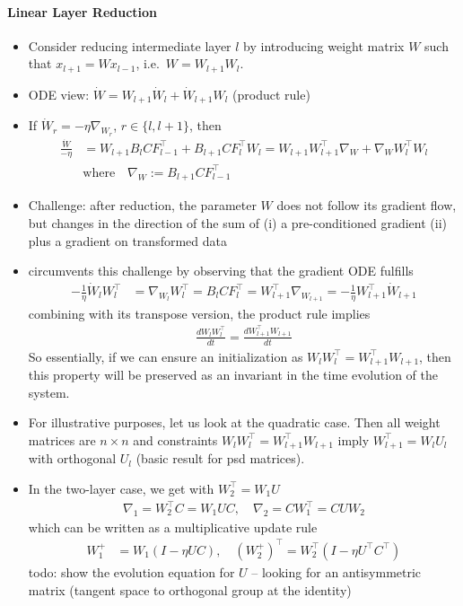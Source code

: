 \documentclass{article}
\begin{document}
\paragraph{Linear Layer Reduction}
\begin{itemize}
\item Consider reducing intermediate layer $l$ by introducing weight matrix $W$ such that $x_{l+1} = W x_{l-1}$, i.e.~$W = W_{l+1} W_{l}$. 
\item ODE view: $\dot W = W_{l+1} \dot W_{l} + \dot W_{l+1} W_l$ (product rule)
\item If $\dot W_r = - \eta \nabla_{W_r}$, $r\in \{l,l+1\}$, then  
\begin{align}
\frac{\dot W}{-\eta} & = W_{l+1} B_{l} C F_{l-1}^\top + B_{l+1}CF_{l}^\top W_l = W_{l+1} W_{l+1}^\top \nabla_W + \nabla_W W_l^\top W_l \\
& \text{where} \quad  \nabla_W := B_{l+1}C F^\top_{l-1}
\end{align}
\item Challenge: after reduction, the parameter $W$ does not follow its gradient flow, but changes in the direction of the sum of (i) a pre-conditioned gradient (ii) plus a gradient on transformed data 
\item  \cite{arora2018optimization} circumvents this challenge by observing that the gradient ODE fulfills
\begin{align}
-\frac{1}{\eta} \dot W_{l} W_{l}^\top & =  \nabla_{W_l} W_{l}^\top = B_{l} C F_{l}^\top  =  W_{l+1}^\top \nabla_{W_{l+1}}  = -\frac{1}{\eta} W_{l+1}^\top \dot W_{l+1} 
\end{align}
combining with its transpose version, the product rule implies 
\begin{align}
\frac{d W_{l} W_{l}^\top}{dt} = \frac{d W_{l+1}^\top W_{l+1}}{dt} 
\end{align}
So essentially, if we can ensure an initialization as $W_{l} W_{l}^\top = W_{l+1}^\top W_{l+1}$, then this property will be preserved as an invariant in the time evolution of the system. 
\item For illustrative purposes, let us look at the quadratic case.  Then all weight matrices are $n \times n$ and  constraints $W_l W_l^\top = W_{l+1}^\top W_{l+1}$ imply $W_{l+1}^\top = W_l U_l$ with orthogonal $U_l$ (basic result for psd matrices). 
\item In the two-layer case, we get with $W_2^\top = W_1 U$
\begin{align}
\nabla_1 = W_2^\top C = W_1  U C, \quad   \nabla_2 = C W_1^\top = C U W_2
\end{align}
which can be written as a multiplicative update rule 
\begin{align}
W_1^+  & = W_1 (I - \eta UC) , \quad  (W_2^{+})^\top = W_2^\top (I - \eta U^\top C^\top) 
\end{align}
todo: show the evolution equation for $U$ -- looking for an antisymmetric matrix (tangent space to orthogonal group at the identity)
\end{itemize}
\end{document}
